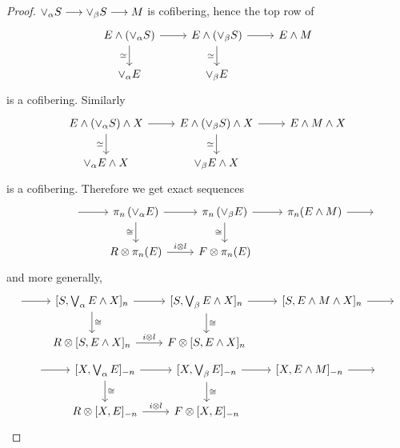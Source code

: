 \documentclass[../main]{subfiles}
\begin{document}
\begin{proof}
$\vee_\alpha S\longrightarrow \vee_\beta S\longrightarrow M$ is cofibering, hence the top row of
\[\begin{tikzcd}
	{E\wedge\left( \vee_\alpha S\right)} & {E\wedge\left( \vee_\beta S\right)} & {E\wedge M} \\
	{\vee_\alpha E} & {\vee_\beta E}
	\arrow[from=1-1, to=1-2]
	\arrow[from=1-2, to=1-3]
	\arrow["\simeq"', from=1-2, to=2-2]
	\arrow["\simeq"', from=1-1, to=2-1]
\end{tikzcd}\]
is a cofibering. Similarly
\[\begin{tikzcd}
	{E\wedge\left( \vee_\alpha S\right)\wedge X} & {E\wedge\left( \vee_\beta S\right)\wedge X} & {E\wedge M \wedge X} \\
	{\vee_\alpha E \wedge X} & {\vee_\beta E \wedge X}
	\arrow[from=1-1, to=1-2]
	\arrow[from=1-2, to=1-3]
	\arrow["\simeq"', from=1-2, to=2-2]
	\arrow["\simeq"', from=1-1, to=2-1]
\end{tikzcd}\]
is a cofibering. Therefore we get exact sequences
\[\begin{tikzcd}
	{} & {} & {\pi_n\left( \vee_\alpha E \right)} & {\pi_n \left( \vee_\beta E \right)} & {\pi_n(E\wedge M)} & {} \\
	&& {R\otimes \pi_n(E)} & {F\otimes \pi_n(E)}
	\arrow[from=1-4, to=1-5]
	\arrow[from=1-5, to=1-6]
	\arrow["\cong"', from=1-4, to=2-4]
	\arrow[from=1-3, to=1-4]
	\arrow["{i\otimes l}", from=2-3, to=2-4]
	\arrow["\cong"', from=1-3, to=2-3]
	\arrow[from=1-2, to=1-3]
\end{tikzcd}\]
and more generally,
\[\begin{tikzcd}
	{} & {[S, \bigvee_\alpha E\wedge X]_n} & {[S, \bigvee_\beta E\wedge X]_n} & {[S, E\wedge M\wedge X]_n} & {} \\
	& {R\otimes [S, E\wedge X]_n} & {F\otimes [S, E\wedge X]_n}
	\arrow[from=1-1, to=1-2]
	\arrow[from=1-2, to=1-3]
	\arrow[from=1-3, to=1-4]
	\arrow[from=1-4, to=1-5]
	\arrow["\cong", from=1-2, to=2-2]
	\arrow["\cong", from=1-3, to=2-3]
	\arrow["{i\otimes l}", from=2-2, to=2-3]
\end{tikzcd}\]
\[\begin{tikzcd}
	{} & {[X, \bigvee_\alpha E]_{-n}} & {[X, \bigvee_\beta E]_{-n}} & {[X, E\wedge M]_{-n}} & {} \\
	& {R\otimes [X, E]_{-n}} & {F\otimes [X, E]_{-n}}
	\arrow[from=1-1, to=1-2]
	\arrow[from=1-2, to=1-3]
	\arrow[from=1-3, to=1-4]
	\arrow[from=1-4, to=1-5]
	\arrow["\cong", from=1-2, to=2-2]
	\arrow["\cong", from=1-3, to=2-3]
	\arrow["{i\otimes l}", from=2-2, to=2-3]
\end{tikzcd}\]
\end{proof}
\end{document}
